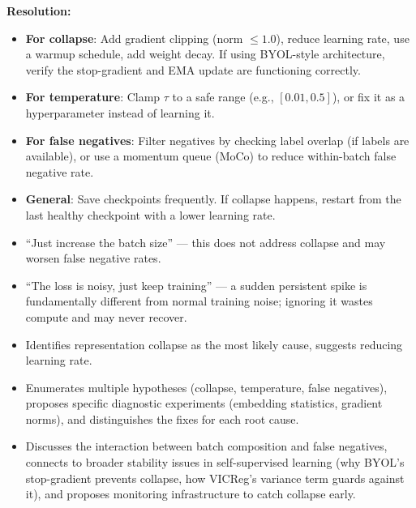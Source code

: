 \begin{interviewq}
\textbf{Resolution:}
\begin{itemize}
    \item \textbf{For collapse}: Add gradient clipping (norm $\leq 1.0$), reduce learning rate, use a warmup schedule, add weight decay. If using BYOL-style architecture, verify the stop-gradient and EMA update are functioning correctly.
    \item \textbf{For temperature}: Clamp $\tau$ to a safe range (e.g., $[0.01, 0.5]$), or fix it as a hyperparameter instead of learning it.
    \item \textbf{For false negatives}: Filter negatives by checking label overlap (if labels are available), or use a momentum queue (MoCo) to reduce within-batch false negative rate.
    \item \textbf{General}: Save checkpoints frequently. If collapse happens, restart from the last healthy checkpoint with a lower learning rate.
\end{itemize}

\redflags
\begin{itemize}
    \item ``Just increase the batch size'' --- this does not address collapse and may worsen false negative rates.
    \item ``The loss is noisy, just keep training'' --- a sudden persistent spike is fundamentally different from normal training noise; ignoring it wastes compute and may never recover.
\end{itemize}


\goodgreat
\begin{itemize}
    \item {} Identifies representation collapse as the most likely cause, suggests reducing learning rate.
    \item {} Enumerates multiple hypotheses (collapse, temperature, false negatives), proposes specific diagnostic experiments (embedding statistics, gradient norms), and distinguishes the fixes for each root cause.
    \item {} Discusses the interaction between batch composition and false negatives, connects to broader stability issues in self-supervised learning (why BYOL's stop-gradient prevents collapse, how VICReg's variance term guards against it), and proposes monitoring infrastructure to catch collapse early.
\end{itemize}

\end{interviewq}

